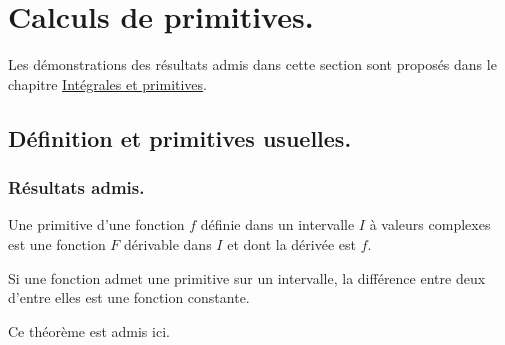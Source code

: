 


\section{Calculs de primitives.}
Les démonstrations des résultats admis dans cette section sont proposés dans le chapitre \href{\baseurl C2190.pdf}{Intégrales et primitives}.

\subsection{Définition et primitives usuelles.}
\subsubsection{Résultats admis.}
\begin{defi}
Une primitive d'une fonction $f$ définie dans un intervalle $I$ à valeurs complexes est une fonction $F$ dérivable dans $I$ et dont la dérivée est $f$. 
\end{defi}
\begin{prop}
Si une fonction admet une primitive sur un intervalle, la différence entre deux d'entre elles est une fonction constante.
\end{prop}
\begin{demo}
 Ce théorème est admis ici.
\end{demo}
